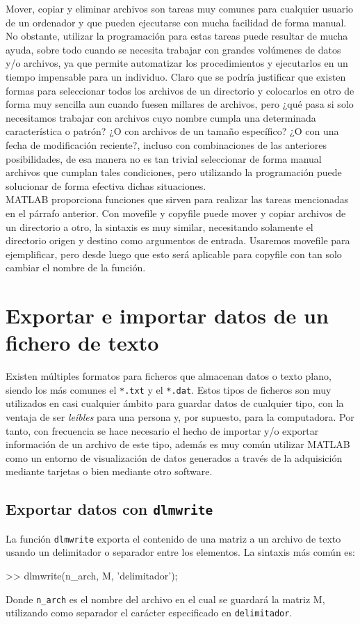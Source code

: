 Mover, copiar y eliminar archivos son tareas muy comunes para cualquier
usuario de un ordenador y que pueden ejecutarse con mucha facilidad de
forma manual. No obstante, utilizar la programación para estas tareas
puede resultar de mucha ayuda, sobre todo cuando se necesita trabajar
con grandes volúmenes de datos y/o archivos, ya que permite automatizar
los procedimientos y ejecutarlos en un tiempo impensable para un
individuo. Claro que se podría justificar que existen formas para
seleccionar todos los archivos de un directorio y colocarlos en otro de
forma muy sencilla aun cuando fuesen millares de archivos, pero ¿qué
pasa si solo necesitamos trabajar con archivos cuyo nombre cumpla una
determinada característica o patrón? ¿O con archivos de un tamaño
específico? ¿O con una fecha de modificación reciente?, incluso con
combinaciones de las anteriores posibilidades, de esa manera no es tan
trivial seleccionar de forma manual archivos que cumplan tales
condiciones, pero utilizando la programación puede solucionar de forma
efectiva dichas situaciones. \\

MATLAB proporciona funciones que sirven para realizar las tareas
mencionadas en el párrafo anterior. Con movefile y copyfile puede mover
y copiar archivos de un directorio a otro, la sintaxis es muy similar,
necesitando solamente el directorio origen y destino como argumentos de
entrada. Usaremos movefile para ejemplificar, pero desde luego que esto
será aplicable para copyfile con tan solo cambiar el nombre de la
función.

\section{Exportar e importar datos de un fichero de texto}

Existen múltiples formatos para ficheros que almacenan datos o texto
plano, siendo los más comunes el \texttt{*.txt} y el \texttt{*.dat}.
Estos tipos de ficheros son muy utilizados en casi cualquier ámbito para
guardar datos de cualquier tipo, con la ventaja de ser \emph{leíbles}
para una persona y, por supuesto, para la computadora. Por tanto, con
frecuencia se hace necesario el hecho de importar y/o exportar
información de un archivo de este tipo, además es muy común utilizar
MATLAB como un entorno de visualización de datos generados a través de
la adquisición mediante tarjetas o bien mediante otro software.

\subsection{Exportar datos con \texttt{dlmwrite}}

La función \texttt{dlmwrite} exporta el contenido de una matriz a un
archivo de texto usando un delimitador o separador entre los elementos.
La sintaxis más común es:

\begin{matlab}
>> dlmwrite(n_arch, M, 'delimitador');
\end{matlab}

Donde \texttt{n\_arch} es el nombre del archivo en el cual se guardará
la matriz M, utilizando como separador el carácter especificado en \texttt{delimitador}.
